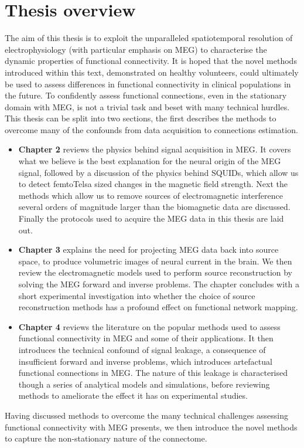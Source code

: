\section{Thesis overview}
The aim of this thesis is to exploit the unparalleled spatiotemporal resolution of electrophysiology (with particular emphasis on MEG) to characterise the dynamic properties of functional connectivity. It is hoped that the novel methods introduced within this text, demonstrated on healthy volunteers, could ultimately be used to assess differences in functional connectivity in clinical populations in the future. To confidently assess functional connections, even in the stationary domain with MEG, is not a trivial task and beset with many technical hurdles. This thesis can be split into two sections, the first describes the methods to overcome many of the confounds from data acquisition to connections estimation.

\begin{itemize}
	\item \textbf{Chapter 2} reviews the physics behind signal acquisition in MEG. It covers what we believe is the best explanation for the neural origin of the MEG signal, followed by a discussion of the physics behind SQUIDs, which allow us to detect femtoTelsa sized changes in the magnetic field strength. Next the methods which allow us to remove sources of electromagnetic interference several orders of magnitude larger than the biomagnetic data are discussed. Finally the protocols used to acquire the MEG data in this thesis are laid out.
	\item \textbf{Chapter 3} explains the need for projecting MEG data back into source space, to produce volumetric images of neural current in the brain. We then review the electromagnetic models used to perform source reconstruction by solving the MEG forward and inverse problems. The chapter concludes with a short experimental investigation into whether the choice of source reconstruction methods has a profound effect on functional network mapping. 
	\item \textbf{Chapter 4} reviews the literature on the popular methods used to assess functional connectivity in MEG and some of their applications. It then introduces the technical confound of signal leakage, a consequence of insufficient forward and inverse problems, which introduces artefactual functional connections in MEG. The nature of this leakage is characterised though a series of analytical models and simulations, before reviewing methods to ameliorate the effect it has on experimental studies. 
\end{itemize} Having discussed methods to overcome the many technical challenges assessing functional connectivity with MEG presents, we then introduce the novel methods to capture the non-stationary nature of the connectome.

